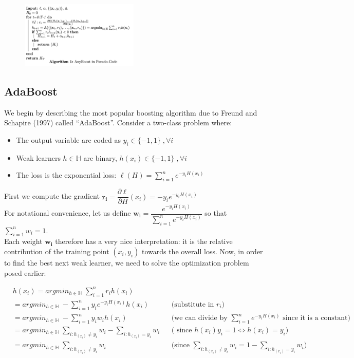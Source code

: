 \documentclass[twoside]{article}
\begin{document}
\begin{figure}[h]
\centering
\includegraphics[width=0.5\textwidth]{img/anyboost.png}
\end{figure}

\subsection{AdaBoost}

We begin by describing the most popular boosting algorithm due to
Freund and Schapire (1997) called “AdaBoost”. Consider a two-class
problem where:
\begin{itemize}
    \item The output variable are coded as $y_{i} \in \{ -1, 1\} \; , \forall i $
    \item Weak learners $h \in \mathbb{H}$ are binary, $h(x_{i}) \in \{-1,1\} \; , \forall i$
    \item The loss is the exponential loss: $\ell(H) = \sum_{i=1}^{n} e^{-y_{i}H(x_{i})}$
\end{itemize}

First we compute the gradient $\mathbf{r_{i}} = \dfrac{\partial \ell}{\partial H} (x_{i}) = -y_{i}e^{-y_{i}H(x_{i})} $ \\
For notational convenience, let us define $ \mathbf{w_{i}} = \dfrac{e^{-y_{i}H(x_{i})}}{\sum_{i=1}^{n} e^{-y_{i}H(x_{i})}} $ so that $\sum_{i=1}^{n}w_{i} = 1$.  \\
Each weight $\mathbf{w_{i}}$ therefore has a very nice interpretation: it is the relative contribution of the training point $(x_{i},y_{i})$ towards the overall loss. Now, in order to find the best next weak learner, we need to solve the optimization problem posed earlier:



\begin{equation*}
\begin{aligned}
&   h(x_{i}) = argmin_{h \in \mathbb{H}} \; \sum_{i=1}^{n} r_{i} h(x_{i}) 
  \\
  &= argmin_{h \in \mathbb{H}} \; -\sum_{i=1}^{n} y_{i}e^{-y_{i}H(x_{i})} h(x_{i}) && \text{(substitute in $r_{i}$)}\\
&  = argmin_{h \in \mathbb{H}} \; -\sum_{i=1}^{n} y_{i}w_{i} h(x_{i}) &&  \text{(we can divide by $\sum_{i=1}^{n} e^{-y_{i}H(x_{i})}$ since it is a constant)} \\
& = argmin_{h \in \mathbb{H}} \; \sum_{i: h_(x_{i}) \not = y_{i}} w_{i} - \sum_{i: h_(x_{i})  = y_{i}} w_{i} && \text{( since $h(x_{i})y_{i} = 1 \iff h(x_{i}) = y_{i} $)} \\
& = argmin_{h \in \mathbb{H}} \; \sum_{i: h_(x_{i}) \not = y_{i}} w_{i} && \text{(since $\sum_{i: h_(x_{i}) \not = y_{i}} w_{i} = 1 - \sum_{i: h_(x_{i})  = y_{i}} w_{i}$)}
\end{aligned}
\end{equation*}
\end{document}
